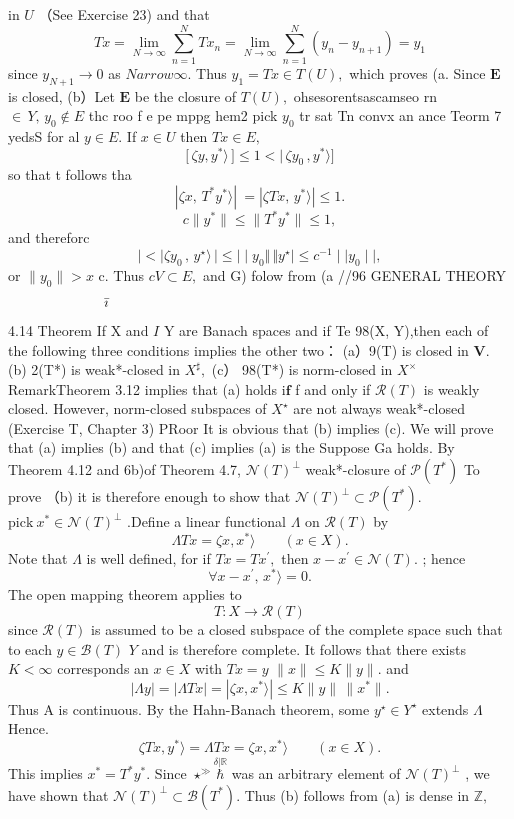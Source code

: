 in $U$ （See Exercise 23) and that $$ T x=\operatorname*{lim}_{N\to\infty}\sum_{n=1}^{N}T x_{n}=\operatorname*{lim}_{N\to\infty}\sum_{n=1}^{N}(y_{n}-y_{n+1})=y_{1} $$ since $y_{N+1}\to0$ as $N arrow\infty.$ Thus $y_{1}=T x\in T(U),$ which proves (a. Since ${\boldsymbol{E}}$ is closed, (b）Let $\boldsymbol{E}$ be the closure of $T(U),$ ohsesorentsascamseo rn $\in\,Y,\,y_{0}\notin E$ thc roo f e pe mppg hem2 pick $y_{0}$ tr sat Tn convx an ance Teorm 7 yedsS for al $y\in E.$ If $x\in U$ then $T x\in E,$ $$ \big\lbrack\,\zeta y,y^{\ast}\big\rangle\,\big\rbrack\leq1< \vert\,\zeta y_{0}\,,y^{\ast} \rangle\big\rbrack $$ so that t follows tha $$ \textstyle|\zeta x,\,T^{*}y^{*}\rangle|\ =|\zeta T x,\,y^{*}\rangle|\leq1. $$ $$ c\|y^{*}\|\leq\|T^{*}y^{*}\|\leq1, $$ and thereforc $$ \mid<\mid\zeta y_{0}\,,\,y^{\star}\rangle\,\mid\leq\mid\mid y_{0}\Vert\,\Vert y^{\star}\mid\leq c^{-1}\mid\mid y_{0}\mid\mid, $$ or $\|y_{0}\|>x$ c. Thus $c V\subset E,$ and G) folow from (a //96 GENERAL THEORY $$ \begin{array}{c c c c c c c c c c c c c c c c c c c c}{{\bar{\imath}}}&{{\quad}}&{{\quad}}&{{\quad}}&{{\quad}}&{{\quad}}&{{\quad}}&{{\quad}}&{{\quad}}&{{\quad}}&{{\quad}}&{{\quad}}\end{array} $$ 4.14 Theorem If X and $\boldsymbol{\mathit{I}}$ Y are Banach spaces and if Te 98(X, Y),then each of the following three conditions implies the other two： (a）9(T) is closed in ${\boldsymbol{V}}.$ (b) 2(T*) is weak*-closed in $X^{\sharp},$ (c） 98(T*) is norm-closed in $X^{\times}$ RemarkTheorem 3.12 implies that (a) holds $\mathrm{i}\mathbf{f}$ f and only if ${\mathcal{R}}(T)$ is weakly closed. However, norm-closed subspaces of $X^{\star}$ are not always weak*-closed (Exercise T, Chapter 3) PRoor It is obvious that (b) implies (c). We will prove that (a) implies (b) and that (c) implies (a) is the Suppose Ga holds. By Theorem 4.12 and 6b)of Theorem 4.7, ${\mathcal{N}}(T)^{\perp}$ weak*-closure of ${\mathcal{P}}(T^{*})$ To prove （b) it is therefore enough to show that ${\mathcal{N}}(T)^{\perp}\subset{\mathcal{P}}(T^{*}).$ $\mathrm{pick~}x^{*}\in{\mathcal{N}}(T)^{\perp}$ .Define a linear functional $\Lambda$ on ${\mathcal{R}}(T)$ by $$ \Lambda T x=\zeta x,x^{*}\rangle\qquad(x\in X). $$ Note that $\Lambda$ is well defined, for if $T x=T x^{\prime},$ then $x-x^{\prime}\in{\mathcal{N}}(T).$ ; hence $$ \forall x-x^{\prime},\,x^{*}\rangle=0. $$ The open mapping theorem applies to $$ T:X\to{\mathcal{R}}(T) $$ since ${\mathcal{R}}(T)$ is assumed to be a closed subspace of the complete space such that to each $y\in{\mathcal{B}}(T)$ ${\mathbf{}}Y$ and is therefore complete. It follows that there exists $K<\infty$ corresponds an $x\in X$ with $T x=y$ $\|x\|\leq K\|y\|.$ and $$ |\Lambda y|=|\Lambda T x|=|\zeta x,x^{*}\rangle|\leq K\|y\|\,\|x^{*}\|. $$ Thus A is continuous. By the Hahn-Banach theorem, some $y^{\star}\in Y^{\star}$ extends $\Lambda$ Hence. $$ \zeta T x,y^{*}\rangle=\Lambda T x=\zeta x,x^{*}\rangle\qquad(x\in X). $$ This implies $x^{*}=T^{*}y^{*}.$ Since $\star^{\gg}{\stackrel{\delta|\mathbb{R}}{\hbar}}$ was an arbitrary element of ${\mathcal{N}}(T)^{\perp}$ , we have shown that ${\mathcal{N}}(T)^{\perp}\subset{\mathcal{B}}(T^{*}).$ Thus (b) follows from (a) is dense in $\mathbb{Z},$ 